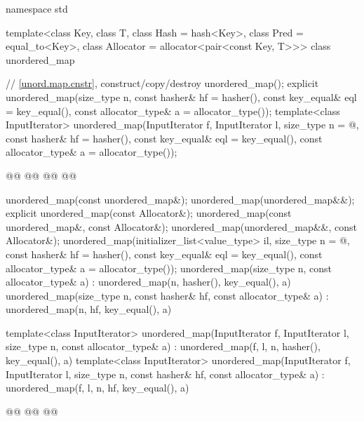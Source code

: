 \documentclass{wg21}
\begin{document}
%
\begin{codeblock}
namespace std {
template<class Key,
class T,
class Hash = hash<Key>,
class Pred = equal_to<Key>,
class Allocator = allocator<pair<const Key, T>>>
class unordered_map {
    // \ref{unord.map.cnstr}, construct/copy/destroy
    unordered_map();
    explicit unordered_map(size_type n, const hasher& hf = hasher(),
        const key_equal& eql = key_equal(), const allocator_type& a = allocator_type());
    template<class InputIterator>
    unordered_map(InputIterator f, InputIterator l, size_type n = @\seebelow@,
        const hasher& hf = hasher(), const key_equal& eql = key_equal(),
        const allocator_type& a = allocator_type());

    @@
    @@
    @@
    @@

    unordered_map(const unordered_map&);
    unordered_map(unordered_map&&);
    explicit unordered_map(const Allocator&);
    unordered_map(const unordered_map&, const Allocator&);
    unordered_map(unordered_map&&, const Allocator&);
    unordered_map(initializer_list<value_type> il, size_type n = @\seebelow@,
        const hasher& hf = hasher(),
        const key_equal& eql = key_equal(),
        const allocator_type& a = allocator_type());
    unordered_map(size_type n, const allocator_type& a)
    : unordered_map(n, hasher(), key_equal(), a) { }
    unordered_map(size_type n, const hasher& hf, const allocator_type& a)
    : unordered_map(n, hf, key_equal(), a) { }

    template<class InputIterator>
    unordered_map(InputIterator f, InputIterator l, size_type n, const allocator_type& a)
    : unordered_map(f, l, n, hasher(), key_equal(), a) { }
    template<class InputIterator>
    unordered_map(InputIterator f, InputIterator l, size_type n, const hasher& hf,
    const allocator_type& a)
    : unordered_map(f, l, n, hf, key_equal(), a) { }

    @@
    @@
    @@

}}
\end{codeblock}
\end{document}
